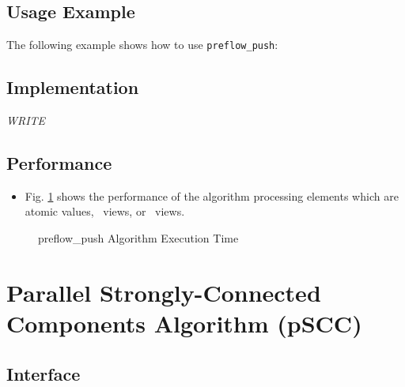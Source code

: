 \subsection{Usage Example} \label{sec-preflow-push-alg-use}

The following example shows how to use 
\texttt{preflow\_push}:


\subsection{Implementation} \label{sec-preflow-push-alg-impl}

\textit{WRITE}

\subsection{Performance} \label{sec-preflow-push-alg-perf}

\begin{itemize}
\item
Fig. \ref{fig:preflow-push-alg-exec-exper}
shows the performance of the algorithm processing
elements which are atomic values, \stl\ views, or \stapl\ views.
\end{itemize}

\begin{figure}[p]
\caption{ preflow\_push Algorithm Execution Time}
\label{fig:preflow-push-alg-exec-exper}
\end{figure}


\section{Parallel Strongly-Connected Components Algorithm (pSCC)}
\label{sec-pscc-alg}

\subsection{Interface} \label{sec-pscc-alg-inter}


